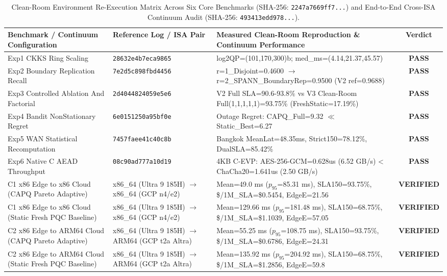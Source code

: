 \documentclass[10pt,journal,compsoc]{IEEEtran}
\begin{document}
\begin{table}[!htbp]\centering\scriptsize
\caption{Clean-Room Environment Re-Execution Matrix Across Six Core Benchmarks (SHA-256: \texttt{2247a7669ff7...}) and End-to-End Cross-ISA Continuum Audit (SHA-256: \texttt{493413edd978...}).}
\setlength{\tabcolsep}{3.6pt}\begin{tabular}{@{}lllc@{}}\toprule
\textbf{Benchmark / Continuum Configuration} & \textbf{Reference Log / ISA Pair} & \textbf{Measured Clean-Room Reproduction \& Continuum Performance} & \textbf{Verdict} \\\midrule
Exp1 CKKS Ring Scaling & \texttt{28632e4b7eca9865} & log2QP=(101,170,300)b; med\_ms=(4.14,21.37,45.57) & \textbf{PASS} \\
Exp2 Boundary Replication Recall & \texttt{7e2d5c898fbd4456} & r=1\_Disjoint=0.4600 $\to$ r=2\_SPANN\_BoundaryRep=0.9500 (V2 ref=0.9688) & \textbf{PASS} \\
Exp3 Controlled Ablation And Factorial & \texttt{2d4044824059e5e6} & V2 Full SLA=90.6-93.8\% vs V3 Clean-Room Full(1,1,1,1,1)=93.75\% (FreshStatic=17.19\%) & \textbf{PASS} \\
Exp4 Bandit NonStationary Regret & \texttt{6e0151250a95bf0e} & Outage Regret: CAPQ\_Full=9.32 $\ll$ Static\_Best=6.27 & \textbf{PASS} \\
Exp5 WAN Statistical Recomputation & \texttt{7457faee41c40c8b} & Bangkok MeanLat=48.35ms, Strict150=78.12\%, DualSLA=85.42\% & \textbf{PASS} \\
Exp6 Native C AEAD Throughput & \texttt{08c90ad777a10d19} & 4KB C-EVP: AES-256-GCM=0.628us (6.52 GB/s) < ChaCha20=1.641us (2.50 GB/s) & \textbf{PASS} \\
\midrule
C1 x86 Edge to x86 Cloud (CAPQ Pareto Adaptive) & x86\_64 (Ultra 9 185H) $\to$ x86\_64 (GCP n4/e2) & Mean=49.0 ms ($p_{95}$=85.31 ms), SLA150=93.75\%, \$/1M\_SLA=\$0.5454, EdgeE=21.56 & \textbf{VERIFIED} \\
C1 x86 Edge to x86 Cloud (Static Fresh PQC Baseline) & x86\_64 (Ultra 9 185H) $\to$ x86\_64 (GCP n4/e2) & Mean=129.66 ms ($p_{95}$=181.48 ms), SLA150=68.75\%, \$/1M\_SLA=\$1.1039, EdgeE=57.05 & \textbf{VERIFIED} \\
C2 x86 Edge to ARM64 Cloud (CAPQ Pareto Adaptive) & x86\_64 (Ultra 9 185H) $\to$ ARM64 (GCP t2a Altra) & Mean=55.25 ms ($p_{95}$=108.75 ms), SLA150=93.75\%, \$/1M\_SLA=\$0.6786, EdgeE=24.31 & \textbf{VERIFIED} \\
C2 x86 Edge to ARM64 Cloud (Static Fresh PQC Baseline) & x86\_64 (Ultra 9 185H) $\to$ ARM64 (GCP t2a Altra) & Mean=135.92 ms ($p_{95}$=204.92 ms), SLA150=68.75\%, \$/1M\_SLA=\$1.2856, EdgeE=59.8 & \textbf{VERIFIED} \\

\end{tabular}
\end{table}
\end{document}
